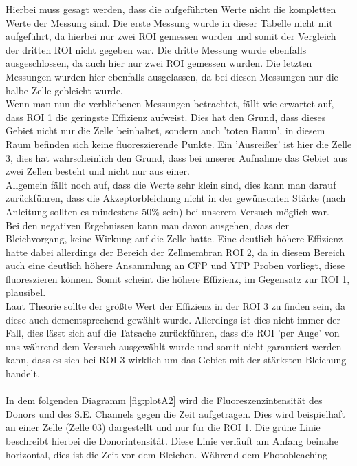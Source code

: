 Hierbei muss gesagt werden, dass die aufgeführten Werte nicht die kompletten Werte der Messung sind. 
Die erste Messung wurde in dieser Tabelle nicht mit aufgeführt, da hierbei nur zwei ROI gemessen wurden und 
somit der Vergleich der dritten ROI nicht gegeben war. Die dritte Messung wurde ebenfalls ausgeschlossen, 
da auch hier nur zwei ROI gemessen wurden. 
Die letzten Messungen wurden hier ebenfalls ausgelassen, da bei diesen Messungen nur die 
halbe Zelle gebleicht wurde. \\
Wenn man nun die verbliebenen Messungen betrachtet, fällt wie erwartet auf, dass 
ROI 1 die geringste Effizienz aufweist. Dies hat den Grund, dass dieses Gebiet nicht nur
die Zelle beinhaltet, sondern auch 'toten Raum', in diesem Raum befinden sich keine 
fluoreszierende Punkte. Ein 'Ausreißer' ist hier die Zelle 3, dies hat wahrscheinlich den Grund, 
dass bei unserer Aufnahme das Gebiet aus zwei Zellen besteht und nicht nur aus einer. \\
Allgemein fällt noch auf, dass die Werte sehr klein sind, dies kann man darauf zurückführen, dass die
Akzeptorbleichung nicht in der gewünschten Stärke (nach Anleitung sollten es mindestens 50\% sein) bei unserem Versuch möglich war. \\
Bei den negativen Ergebnissen kann man davon ausgehen, dass der Bleichvorgang, keine Wirkung auf 
die Zelle hatte.
\newpage
Eine deutlich höhere Effizienz hatte dabei allerdings der Bereich der Zellmembran ROI 2, da in diesem Bereich
auch eine deutlich höhere Ansammlung an CFP und YFP Proben vorliegt, diese fluoreszieren können. Somit scheint 
die höhere Effizienz, im Gegensatz zur ROI 1, plausibel.\\
Laut Theorie sollte der größte Wert der Effizienz in der ROI 3 zu finden sein, da diese auch dementsprechend gewählt wurde. 
Allerdings ist dies nicht immer der Fall, dies lässt sich auf die Tatsache zurückführen, 
dass die ROI 'per Auge' von uns während dem Versuch ausgewählt wurde und somit nicht garantiert werden kann, dass
es sich bei ROI 3 wirklich um das Gebiet mit der stärksten Bleichung handelt.\\\\
In dem folgenden Diagramm \ref{fig:plotA2} wird die Fluoreszenzintensität des Donors und des S.E. Channels 
gegen die Zeit aufgetragen. Dies wird beispielhaft an einer Zelle (Zelle 03) dargestellt und nur für die ROI 1.
Die grüne Linie beschreibt hierbei die Donorintensität. Diese Linie verläuft am Anfang
beinahe horizontal, dies ist die Zeit vor dem Bleichen. Während dem Photobleaching 
